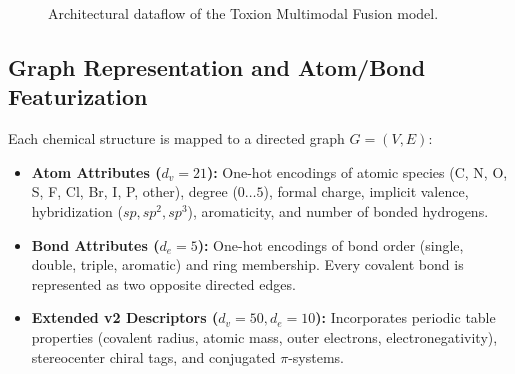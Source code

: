 \documentclass[conference]{IEEEtran}
\newcommand{\sigmoid}{\sigma}
\begin{document}
\begin{figure}[t]
\centering
{}
\caption{Architectural dataflow of the Toxion Multimodal Fusion model.}\label{fig:arch}
\end{figure}

\subsection{Graph Representation and Atom/Bond Featurization}
Each chemical structure is mapped to a directed graph $G = (V, E)$:
\begin{itemize}
    \item \textbf{Atom Attributes ($d_v = 21$):} One-hot encodings of atomic species (C, N, O, S, F, Cl, Br, I, P, other), degree ($0 \dots 5$), formal charge, implicit valence, hybridization ($sp, sp^2, sp^3$), aromaticity, and number of bonded hydrogens.
    \item \textbf{Bond Attributes ($d_e = 5$):} One-hot encodings of bond order (single, double, triple, aromatic) and ring membership. Every covalent bond is represented as two opposite directed edges.
    \item \textbf{Extended v2 Descriptors ($d_v=50, d_e=10$):} Incorporates periodic table properties (covalent radius, atomic mass, outer electrons, electronegativity), stereocenter chiral tags, and conjugated $\pi$-systems.
\end{itemize}
\end{document}

